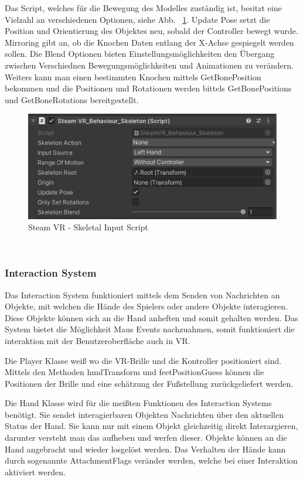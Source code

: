 \begin{itemize}
Das Script, welches für die Bewegung des Modelles zuständig ist, besitzt eine Vielzahl an verschiedenen Optionen, siehe Abb. ~\ref{fig:steamvr_skeletal_input_Script}.
Update Pose setzt die Position und Orientierung des Objektes neu, sobald der Controller bewegt wurde.
Mirroring gibt an, ob die Knochen Daten entlang der X-Achse gespiegelt werden sollen.
Die Blend Optionen bieten Einstellungsmöglichkeiten den Übergang zwischen Verschiednen Bewegungsmöglichkeiten und Animationen zu verändern.
Weiters kann man einen bestimmten Knochen mittels GetBonePosition bekommen und die Positionen und Rotationen werden bittels GetBonePositions und GetBoneRotations bereitgestellt.
\begin {figure}
    \centering
    \includegraphics[scale=1]{pics/steamVR_skeletal_input_script}
    \caption{Steam VR - Skeletal Input Script}
    \label{fig:steamvr_skeletal_input_Script}
\end {figure}
~\cite{SteamVR_Skeleton_Input_2022}

\subsubsection{Interaction System}
Das Interaction System funktioniert mittels dem Senden von Nachrichten an Objekte, mit welchen die Hände des Spielers oder andere Objekte interagieren.
Diese Objekte können sich an die Hand anheften und somit gehalten werden.
Das System bietet die Möglichkeit Maus Events nachzuahmen, somit funktioniert die interaktion mit der Benutzeroberfläche auch in VR.

Die Player Klasse weiß wo die VR-Brille und die Kontroller positioniert sind.
Mittels den Methoden hmdTransform und feetPositionGuess können die Positionen der Brille und eine schätzung der Fußstellung zurückgeliefert werden.

Die Hand Klasse wird für die meißten Funktionen des Interaction Systems benötigt.
Sie sendet interagierbaren Objekten Nachrichten über den aktuellen Status der Hand.
Sie kann nur mit einem Objekt gleichzeitig direkt Interargieren, darunter versteht man das aufheben und werfen dieser.
Objekte können an die Hand angebracht und wieder losgelöst werden.
Das Verhalten der Hände kann durch sogenannte AttachmentFlags veränder werden, welche bei einer Interaktion aktiviert werden.


\end{itemize}
